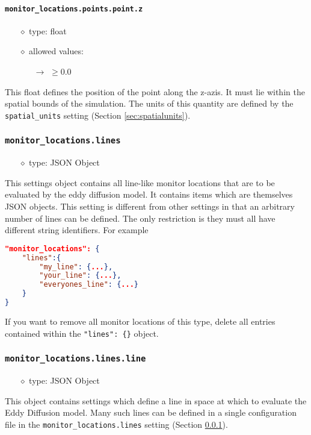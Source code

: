 \documentclass[]{article}
\def\code#1{\texttt{#1}}
\begin{document}
\paragraph{\code{monitor\_locations.points.point.z}}
\begin{itemize}
    \item[$\diamond$] type: float 
    \item[$\diamond$] allowed values:
    \begin{itemize}
        \item[$\rightarrow$] $\geq0.0$
    \end{itemize}
\end{itemize}
This float defines the position of the point along the z-azis. It must lie
within the spatial bounds of the simulation. The units of this quantity are
defined by the \code{spatial\_units} setting (Section \ref{sec:spatialunits}).

\subsubsection{\code{monitor\_locations.lines}}\label{sec:monlines}
\begin{itemize}
    \item[$\diamond$] type: JSON Object 
\end{itemize}
This settings object contains all line-like monitor locations that are to be
evaluated by the eddy diffusion model. It contains items which
are themselves JSON objects. This setting is different from other settings in
that an arbitrary number of lines can be defined. The only restriction is they
must all have different string identifiers. For example\\
\begin{lstlisting}[language=json,firstnumber=1]
"monitor_locations": {
    "lines":{
        "my_line": {...},
        "your_line": {...},
        "everyones_line": {...}
    }
}
\end{lstlisting}
\medskip

\noindent If you want to remove all monitor locations of this type, delete all
entries contained within the \code{"lines": \{\}} object.

\subsubsection{\code{monitor\_locations.lines.line}}
\begin{itemize}
    \item[$\diamond$] type: JSON Object 
\end{itemize}
This object contains settings which define a line in space at which to evaluate
the Eddy Diffusion model. Many such lines can be defined in a single
configuration file in the \code{monitor\_locations.lines} setting (Section
\ref{sec:monlines}).
\end{document}
